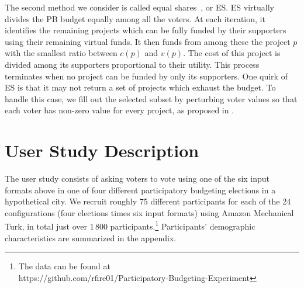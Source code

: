 \documentclass[runningheads]{llncs}
\newcommand{\kibitz}[2]{\ifnum\Comments=1{\color{#1}{#2}}\fi}
\newcommand{\rf}[1]{\kibitz{blue}{[Roy says:#1]}}
\newcommand{\kg}[1]{\kibitz{red}{[Kobi says:#1]}}
\newcommand{\gb}[1]{\kibitz{brown}{[GB:#1]}}
\newcommand{\mes}{ES}
\begin{document}
The  second method we consider is called equal shares~\citep{PS20}, %
 or \mes{}. %
\mes{} virtually  divides the PB budget equally among all the voters. 
At each iteration, it identifies the remaining projects which can be fully funded by their supporters using their remaining virtual funds.
It then funds from among these the  project $p$ with the smallest ratio between $c(p)$ and $v(p)$. 
The cost of this project is divided among its supporters proportional to their utility. %
This process terminates when no project can be funded by only its supporters. %
%
One quirk of \mes{} is that it may not return a set of projects which exhaust the budget. To handle this case, we fill out the selected subset by perturbing voter values so that each voter has non-zero value for every project, as proposed in  \citet{peters2021proportional}. 
 


\section{User Study Description}\label{sec:description}



The user study consists of asking voters to vote using one of the six input formats above in one of four different participatory budgeting elections in a hypothetical city. 
We recruit roughly 75  different participants for each of the 24 configurations (four elections times six input formats)   using Amazon Mechanical Turk, in total  just over $1\,800$ participants.\footnote{The data can be found at\\ https://github.com/rfire01/Participatory-Budgeting-Experiment} Participants' demographic characteristics are summarized in the appendix.   
\end{document}
